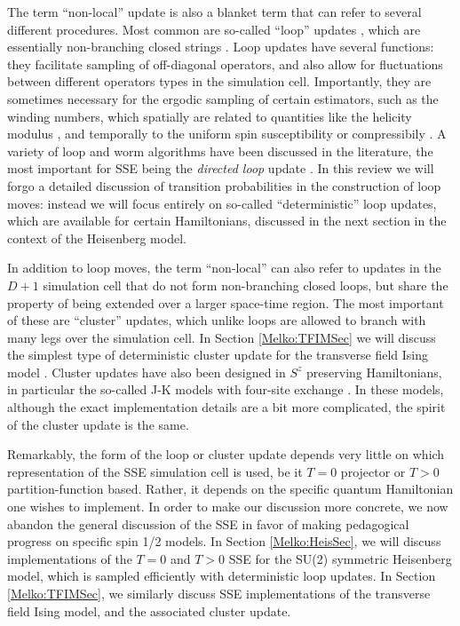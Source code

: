 \documentclass[vecphys]{svmult}
\begin{document}
The term ``non-local'' update is also a blanket term that can refer to several different procedures.  Most common are so-called ``loop'' updates \cite{Melko:Evertz93},
which are essentially non-branching closed strings \cite{Melko:Sandvik99}.  Loop updates have several functions: they facilitate sampling of off-diagonal operators, and also allow for fluctuations between different operators types in the simulation cell.  Importantly, they are sometimes necessary for the ergodic sampling of certain estimators, such as the winding numbers, which spatially are related to quantities like the helicity modulus \cite{Melko:PC}, and temporally to the uniform spin susceptibility or compressibily \cite{Melko:HGEloop}.  A variety of loop and worm algorithms have been discussed in the literature, the most important for SSE being the {\em directed loop} update \cite{Melko:Syljuasen02}.  In this review we will forgo a detailed discussion of transition probabilities in the construction of loop moves: instead we will focus entirely on so-called ``deterministic'' loop updates, which are available for certain Hamiltonians, discussed in the next section in the context of the Heisenberg model.  

In addition to loop moves, the term ``non-local'' can also refer to updates in the $D+1$ simulation cell that do not form non-branching closed loops, but share the property of being extended over a larger space-time region.  The most important of these are ``cluster'' updates,
which unlike loops are allowed to branch with many legs over the simulation cell.
In  Section \ref{Melko:TFIMSec} we will discuss the simplest type of deterministic cluster update for the transverse field Ising model \cite{Melko:Sandvik03}.  Cluster updates have also been designed in $S^z$ preserving Hamiltonians, in particular the so-called J-K models with four-site exchange \cite{Melko:JKqmc}.  In these models, although the exact implementation details are a bit more complicated, the spirit of the cluster update is the same.

Remarkably, the form of the loop or cluster update depends very little on which representation of the SSE simulation cell is used, be it $T=0$ projector or $T>0$ partition-function based.  Rather, it depends on the specific quantum Hamiltonian one wishes to implement.  In order to make our discussion more concrete, we now abandon the general discussion of the SSE in favor of making pedagogical progress on specific spin 1/2 models.  In Section  \ref{Melko:HeisSec}, we will discuss implementations of the $T=0$ and $T>0$ SSE for the SU(2) symmetric Heisenberg model, which is sampled efficiently with deterministic loop updates.  In Section  \ref{Melko:TFIMSec}, we similarly discuss SSE implementations of the transverse field Ising model, and the associated cluster update.
\end{document}
